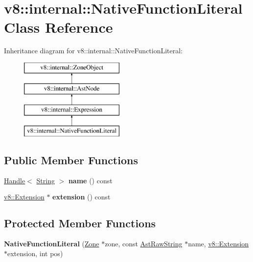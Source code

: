 \hypertarget{classv8_1_1internal_1_1_native_function_literal}{}\section{v8\+:\+:internal\+:\+:Native\+Function\+Literal Class Reference}
\label{classv8_1_1internal_1_1_native_function_literal}
Inheritance diagram for v8\+:\+:internal\+:\+:Native\+Function\+Literal\+:\begin{figure}[H]
\begin{center}
\leavevmode
\includegraphics[height=4.000000cm]{classv8_1_1internal_1_1_native_function_literal}
\end{center}
\end{figure}
\subsection*{Public Member Functions}
\begin{DoxyCompactItemize}
\item 
\hyperlink{classv8_1_1internal_1_1_handle}{Handle}$<$ \hyperlink{classv8_1_1internal_1_1_string}{String} $>$ {\bfseries name} () const \hypertarget{classv8_1_1internal_1_1_native_function_literal_a2a090ba97f6fb9c34e746b5d5f06b5ef}{}\label{classv8_1_1internal_1_1_native_function_literal_a2a090ba97f6fb9c34e746b5d5f06b5ef}

\item 
\hyperlink{classv8_1_1_extension}{v8\+::\+Extension} $\ast$ {\bfseries extension} () const \hypertarget{classv8_1_1internal_1_1_native_function_literal_ae7abf23f0668d304a526e2c8bdc20681}{}\label{classv8_1_1internal_1_1_native_function_literal_ae7abf23f0668d304a526e2c8bdc20681}

\end{DoxyCompactItemize}
\subsection*{Protected Member Functions}
\begin{DoxyCompactItemize}
\item 
{\bfseries Native\+Function\+Literal} (\hyperlink{classv8_1_1internal_1_1_zone}{Zone} $\ast$zone, const \hyperlink{classv8_1_1internal_1_1_ast_raw_string}{Ast\+Raw\+String} $\ast$name, \hyperlink{classv8_1_1_extension}{v8\+::\+Extension} $\ast$extension, int pos)\hypertarget{classv8_1_1internal_1_1_native_function_literal_a82bada3cc7fe4144f0d886a065e893bc}{}\label{classv8_1_1internal_1_1_native_function_literal_a82bada3cc7fe4144f0d886a065e893bc}

\end{DoxyCompactItemize}
